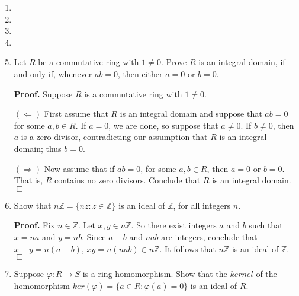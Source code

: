 \documentclass[9pt]{article}
\newcommand{\qed}{\hfill \ensuremath{\Box}}
\newcommand{\Z}{\mathbb{Z}}
\begin{document}
\begin{enumerate}
   \item 
   \item 
   \item 
   \item 
   \item Let $R$ be a commutative ring with $1 \neq 0$. Prove $R$ is an integral
         domain, if and only if, whenever $ab = 0$, then either $a = 0$ or
         $b = 0$.
         
      \textbf{Proof.} Suppose $R$ is a commutative ring with $1 \neq 0$.
      
      $(\Leftarrow)$ First assume that $R$ is an integral domain and suppose that
      $ab = 0$ for some $a, b \in R$. If $a = 0$, we are done, so suppose that
      $a \neq 0$. If $b \neq 0$, then $a$ is a zero divisor, contradicting our
      assumption that $R$ is an integral domain; thus $b = 0$.
      
      $(\Rightarrow)$ Now assume that if $ab = 0$, for some $a, b \in R$, then
      $a = 0$ or $b = 0$. That is, $R$ contains no zero divisors. Conclude that
      $R$ is an integral domain. \qed
   \item Show that $n\Z = \{nz : z \in \Z\}$ is an ideal of $\Z$, for all
         integers $n$.
         
      \textbf{Proof.} Fix $n \in \Z$. Let $x, y \in n\Z$. So there exist
      integers $a$ and $b$ such that $x = na$ and $y = nb$. Since
      $a - b$ and $nab$ are integers, conclude that $x - y = n(a - b)$, 
      $xy = n(nab) \in n\Z$. It follows that $n\Z$ is an ideal of $\Z$. \qed
   \item Suppose $\varphi : R \rightarrow S$ is a ring homomorphism. Show that
         the $\textit{kernel}$ of the homomorphism
         $ker(\varphi) = \{a \in R : \varphi(a) = 0\}$ is an ideal of $R$.
         

\end{enumerate}
\end{document}
